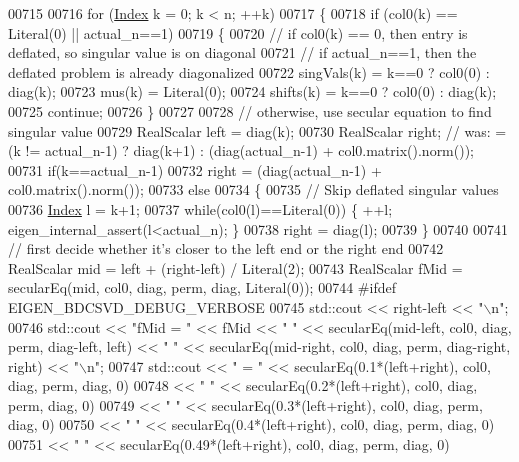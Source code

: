 \begin{DoxyCode}
00715 
00716   \textcolor{keywordflow}{for} (\hyperlink{namespace_eigen_a62e77e0933482dafde8fe197d9a2cfde}{Index} k = 0; k < n; ++k)
00717   \{
00718     \textcolor{keywordflow}{if} (col0(k) == Literal(0) || actual\_n==1)
00719     \{
00720       \textcolor{comment}{// if col0(k) == 0, then entry is deflated, so singular value is on diagonal}
00721       \textcolor{comment}{// if actual\_n==1, then the deflated problem is already diagonalized}
00722       singVals(k) = k==0 ? col0(0) : diag(k);
00723       mus(k) = Literal(0);
00724       shifts(k) = k==0 ? col0(0) : diag(k);
00725       \textcolor{keywordflow}{continue};
00726     \} 
00727 
00728     \textcolor{comment}{// otherwise, use secular equation to find singular value}
00729     RealScalar left = diag(k);
00730     RealScalar right; \textcolor{comment}{// was: = (k != actual\_n-1) ? diag(k+1) : (diag(actual\_n-1) + col0.matrix().norm());}
00731     \textcolor{keywordflow}{if}(k==actual\_n-1)
00732       right = (diag(actual\_n-1) + col0.matrix().norm());
00733     \textcolor{keywordflow}{else}
00734     \{
00735       \textcolor{comment}{// Skip deflated singular values}
00736       \hyperlink{namespace_eigen_a62e77e0933482dafde8fe197d9a2cfde}{Index} l = k+1;
00737       \textcolor{keywordflow}{while}(col0(l)==Literal(0)) \{ ++l; eigen\_internal\_assert(l<actual\_n); \}
00738       right = diag(l);
00739     \}
00740 
00741     \textcolor{comment}{// first decide whether it's closer to the left end or the right end}
00742     RealScalar mid = left + (right-left) / Literal(2);
00743     RealScalar fMid = secularEq(mid, col0, diag, perm, diag, Literal(0));
00744 \textcolor{preprocessor}{#ifdef EIGEN\_BDCSVD\_DEBUG\_VERBOSE}
00745     std::cout << right-left << \textcolor{stringliteral}{"\(\backslash\)n"};
00746     std::cout << \textcolor{stringliteral}{"fMid = "} << fMid << \textcolor{stringliteral}{" "} << secularEq(mid-left, col0, diag, perm, diag-left, left) << \textcolor{stringliteral}{" "} 
      << secularEq(mid-right, col0, diag, perm, diag-right, right)   << \textcolor{stringliteral}{"\(\backslash\)n"};
00747     std::cout << \textcolor{stringliteral}{"     = "} << secularEq(0.1*(left+right), col0, diag, perm, diag, 0)
00748               << \textcolor{stringliteral}{" "}       << secularEq(0.2*(left+right), col0, diag, perm, diag, 0)
00749               << \textcolor{stringliteral}{" "}       << secularEq(0.3*(left+right), col0, diag, perm, diag, 0)
00750               << \textcolor{stringliteral}{" "}       << secularEq(0.4*(left+right), col0, diag, perm, diag, 0)
00751               << \textcolor{stringliteral}{" "}       << secularEq(0.49*(left+right), col0, diag, perm, diag, 0)

\end{DoxyCode}
